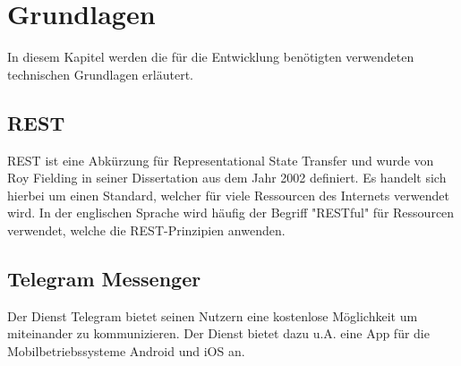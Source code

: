 \chapter{Grundlagen}

In diesem Kapitel werden die für die Entwicklung benötigten verwendeten technischen Grundlagen erläutert.

\section{REST}

REST ist eine Abkürzung für Representational State Transfer und wurde von Roy Fielding in seiner Dissertation aus dem Jahr 2002 definiert. Es handelt sich hierbei um einen Standard, welcher für viele Ressourcen des Internets verwendet wird. In der englischen Sprache wird häufig der Begriff "RESTful" für Ressourcen verwendet, welche die REST-Prinzipien anwenden.

\section{Telegram Messenger}

Der Dienst Telegram bietet seinen Nutzern eine kostenlose Möglichkeit um miteinander zu kommunizieren. Der Dienst bietet dazu u.A. eine App für die Mobilbetriebssysteme Android und iOS an.
